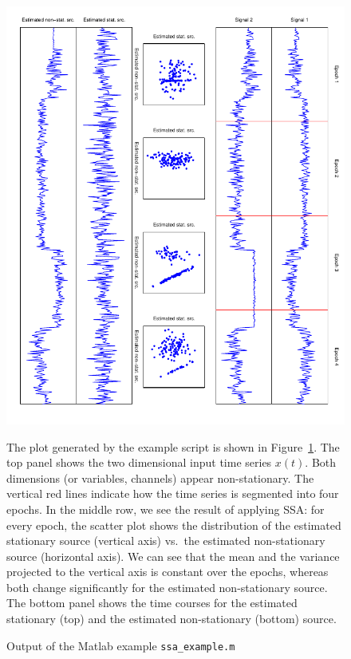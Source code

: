 \documentclass{article}
\newcommand{\1}{\ensuremath{\mathds{1}}}
\newcommand{\0}{\ensuremath{0}}
\begin{document}
\begin{figure}
\begin{center}
	\includegraphics[angle=90,width=12.5cm]{ssa_example.pdf}
	\caption{\label{fig:matlab_example}
		Output of the Matlab example \texttt{ssa\_example.m}} 
\end{center}

The plot generated by the example script is shown in Figure~\ref{fig:matlab_example}. The top panel
shows the two dimensional input time series $x(t)$. Both dimensions (or variables, channels) appear
non-stationary. The vertical red lines indicate how the time series is segmented into four epochs. 
In the middle row, we see the result of applying SSA: for every epoch, the scatter plot shows
the distribution of the estimated stationary source (vertical axis) vs.~the estimated non-stationary 
source (horizontal axis). We can see that the mean and the variance projected to the vertical axis
is constant over the epochs, whereas both change significantly for the estimated non-stationary source. 
The bottom panel shows the time courses for the estimated stationary (top) and the estimated non-stationary 
(bottom) source. 



\end{figure}
\end{document}
